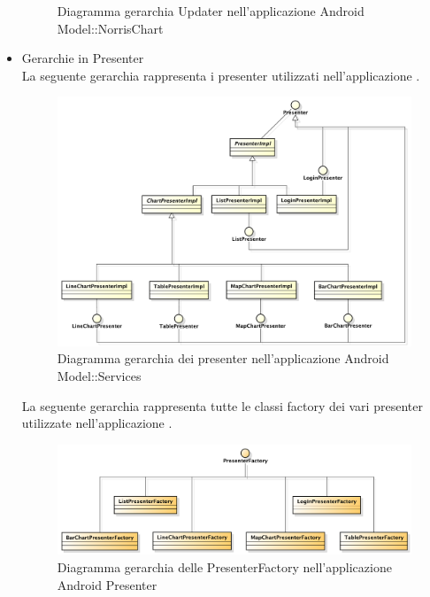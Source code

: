 \begin{itemize}
\begin{figure}[H]
                        \caption{Diagramma gerarchia Updater nell'applicazione Android Model::NorrisChart }
                    \end{figure}
                \item Gerarchie in Presenter \\
                    La seguente gerarchia rappresenta i presenter utilizzati nell'applicazione .
                    \begin{figure}[H]
                        \centering
                        \includegraphics[width=1\textwidth]{DefinizioneDiProdotto/Pics/Gerarchie/ApplicazionePresenter.pdf}
                        \caption{Diagramma gerarchia dei presenter nell'applicazione Android Model::Services}
                    \end{figure}
                    La seguente gerarchia rappresenta tutte le classi factory dei vari presenter utilizzate nell'applicazione .
                    \begin{figure}[H]
                        \centering
                        \includegraphics[width=1\textwidth]{DefinizioneDiProdotto/Pics/Gerarchie/ApplicazionePresenterFactory.pdf}
                        \caption{Diagramma gerarchia delle PresenterFactory nell'applicazione Android Presenter}

\end{figure}
\end{itemize}
